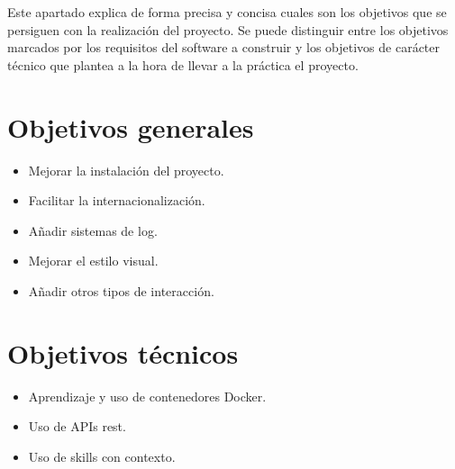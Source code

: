 
Este apartado explica de forma precisa y concisa cuales son los objetivos que se persiguen con la realización del proyecto. Se puede distinguir entre los objetivos marcados por los requisitos del software a construir y los objetivos de carácter técnico que plantea a la hora de llevar a la práctica el proyecto.

\section*{Objetivos generales}
\begin{itemize}
    \item Mejorar la instalación del proyecto.
    \item Facilitar la internacionalización.
    \item Añadir sistemas de log.
    \item Mejorar el estilo visual.
    \item Añadir otros tipos de interacción.
\end{itemize}

\section*{Objetivos técnicos}
\begin{itemize}
    \item Aprendizaje y uso de contenedores Docker.
    \item Uso de APIs rest.
    \item Uso de skills con contexto.
    
\end{itemize}
